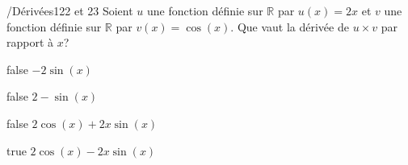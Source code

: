         	\begin{question}{/}{Dérivées}{1}{22 et 23}
				Soient $u$ une fonction définie sur $\mathbb{R}$ par $u(x)=2x$ et $v$ une fonction définie sur $\mathbb{R}$ par  $v(x)=\cos(x)$. Que vaut la dérivée de $u\times v$ par rapport à $x$?
            \end{question}
            \begin{reponses}
            	\item[false] $-2\sin(x)$
            	\item[false] $2-\sin(x)$
                \item[false] $2\cos(x)+2x\sin(x)$
                \item[true] $2\cos(x)-2x\sin(x)$
            \end{reponses}
